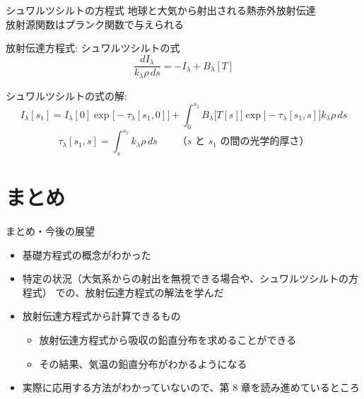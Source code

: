 \documentclass[unicode,colorlinks]{beamer}
\begin{document}
\begin{frame}{シュワルツシルトの方程式}
	地球と大気から射出される熱赤外放射伝達\\
	放射源関数はプランク関数で与えられる

	放射伝達方程式: シュワルツシルトの式
	\[\frac{dI_\lambda}{k_\lambda\rho\,ds}=-I_\lambda+B_\lambda[T]\]

	シュワルツシルトの式の解:
	\[I_\lambda[s_1]=I_\lambda[0]\exp\bigl[-\tau_\lambda[s_1,0]\bigr]+
		\int^{s_1}_{0}B_\lambda\bigl[T[s]\bigr]\exp\bigl[-\tau_\lambda[s_1,s]\bigr]k_\lambda\rho\,ds\]
	\[\tau_\lambda[s_1,s]=\int^{s_1}_s k_\lambda\rho\,ds\qquad\text{（$s$ と $s_1$ の間の光学的厚さ）}\]
\end{frame}


\section{まとめ}

\begin{frame}{まとめ・今後の展望}
	\begin{itemize}
		\item 基礎方程式の概念がわかった
		\item 特定の状況（大気系からの射出を無視できる場合や、シュワルツシルトの方程式）
			での、放射伝達方程式の解法を学んだ
		\item 放射伝達方程式から計算できるもの
			\begin{itemize}
				\item 放射伝達方程式から吸収の鉛直分布を求めることができる
				\item その結果、気温の鉛直分布がわかるようになる
			\end{itemize}
		\item 実際に応用する方法がわかっていないので、第 8 章を読み進めているところ
	\end{itemize}
\end{frame}
\end{document}
